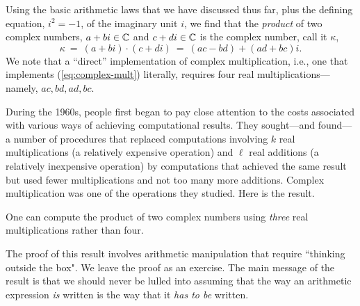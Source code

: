 Using the basic arithmetic laws that we have discussed thus far, plus
the defining equation, $i^2 = -1$, of the imaginary unit $i$, we find
that the {\em product} of two complex numbers, $a+bi \in \mathbb{C}$ and $c+di
\in \mathbb{C}$ is the complex number, call it $\kappa$,
\begin{equation}
\label{eq:complex-mult}
\kappa \ = \ (a+bi) \cdot (c+di) \ = \ (ac - bd) + (ad + bc)i.
\end{equation}
We note that a ``direct'' implementation of complex multiplication,
i.e., one that implements (\ref{eq:complex-mult}) literally, requires
four real multiplications---namely, $ac, bd, ad, bc$.

During the 1960s, people first began to pay close attention to the
costs associated with various ways of achieving computational results.
They sought---and found---a number of procedures that replaced
computations involving $k$ real multiplications (a relatively
expensive operation) and $\ell$ real additions (a relatively
inexpensive operation) by computations that achieved the same result
but used fewer multiplications and not too many more additions.
Complex multiplication was one of the operations they studied.  Here
is the result.

\begin{prop}
\label{thm:complex-mult-3real}
One can compute the product of two complex numbers using {\em three}
real multiplications rather than four.
\end{prop}

The proof of this result involves arithmetic manipulation that require
``thinking outside the box".  We leave the proof as an exercise.  The main
message of the result is that we should never be lulled into assuming that the way
an arithmetic expression {\em is} written is the way that it {\em has
  to be} written.


